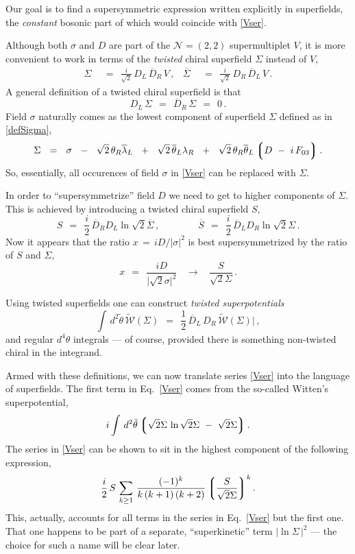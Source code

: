 \documentclass[epsfig,12pt]{article}
\def\beq{\begin{equation}}
\def\eeq{\end{equation}}
\newcommand{\ntwot}{${\mathcal N}= \left(2,2\right) $ }
\newcommand{\cw}{{\mathcal W}}
\newcommand{\wt}{\widetilde}
\newcommand{\ov}{\overline}
\newcommand{\lgr}{\left\lgroup}
\newcommand{\rgr}{\right\rgroup}
\begin{document}
	Our goal is to find a supersymmetric expression written explicitly in superfields,
	the {\it constant} bosonic part of which would coincide with \eqref{Vser}.

	Although both $ \sigma $ and $ D $ are part of the \ntwot supermultiplet $ V $,
	it is more convenient to work in terms of the {\it twisted} chiral superfield $ \Sigma $
	instead of $ V $,
\begin{align}
\label{defSigma}
	\Sigma    & ~~=~~    \frac{i}{\sqrt 2}\, D_L\, \ov D{}_R\, V\,,
	&
	\ov \Sigma    & ~~=~~    \frac{i}{\sqrt 2}\, D_R\, \ov D{}_L\, V\,.
\end{align}
	A general definition of a twisted chiral superfield is that
\beq
	D_L\, \Sigma    ~~=~~    \ov D{}_R\, \Sigma    ~~=~~    0\,.
\eeq
	Field $ \sigma $ naturally comes as the lowest component of superfield $ \Sigma $
	defined as in \eqref{defSigma},
\beq
	\Sigma     ~~=~~    \sigma  ~~-~~  \sqrt{2}\, \theta_R \ov\lambda{}_L
				    ~~+~~  \sqrt{2}\, \ov\theta{}_L \lambda_R
				    ~~+~~  \sqrt{2}\, \theta_R \ov\theta{}_L \lgr D ~-~ i\, F_{03} \rgr.
\eeq
	So, essentially, all occurences of field $ \sigma $ in \eqref{Vser} can be replaced with $ \Sigma $.

	In order to ``supersymmetrize'' field $ D $ we need to get to higher components of $ \Sigma $.
	This is achieved by introducing a twisted chiral superfield $ S $,
\beq
	S    ~~=~~    \frac{i}{2}\,\ov D{}_R D_L \ln \sqrt{2}\ov\Sigma\,,
	\qquad\qquad
	\ov S    ~~=~~    \frac{i}{2}\, \ov D{}_L D_R \ln \sqrt{2}\Sigma\,.
\eeq
	Now it appears that the ratio $ x \,=\, iD/|\sigma|^2 $ is best supersymmetrized \cite{1p} by
	the ratio of $ S $ and $ \Sigma $,
\beq
	x    ~~=~~    \frac{iD}{\big|\sqrt{2}\sigma\big|^2}    ~~~~\longrightarrow~~~~
		\frac{S}{\sqrt{2}\Sigma}\,.
\eeq

	Using twisted superfields one can construct {\it twisted superpotentials}
\beq
	\int\, d^2\tilde\theta\, \wt{\cw}(\Sigma)    ~~=~~    \frac{1}{2}\,\ov D{}_L\, D_R\, \wt{\cw}(\Sigma)\Big|\,,
\eeq
	and regular $ d^4\theta $ integrals --- of course, provided there is something non-twisted chiral
	in the integrand.

	Armed with these definitions, we can now translate series \eqref{Vser} into
	the language of superfields.
	The first term in Eq.~\eqref{Vser} comes from the so-called Witten's superpotential,
\beq
	i \int\, d^2\tilde\theta 
	\lgr
		\sqrt{2}\Sigma\, \ln \sqrt{2}\Sigma  ~-~ \sqrt{2}\Sigma
	\rgr.
\eeq
	The series in \eqref{Vser} can be shown to sit in the highest component of
	the following expression,
\beq
	\frac{i}{2}\, 
	S\,
	\sum_{k \geq 1}\, \frac{    (-1)^k    }
                           {  k\,(k + 1)\,(k + 2)  } \lgr \frac{S}{\sqrt{2}\Sigma} \rgr^k.
\eeq
	This, actually, accounts for all terms in the series in Eq.~\eqref{Vser} but the first one.
	That one happens to be part of a separate, ``superkinetic'' term $ |\ln \Sigma\,|^2 $ ---
	the choice for such a name will be clear later.
\end{document}
